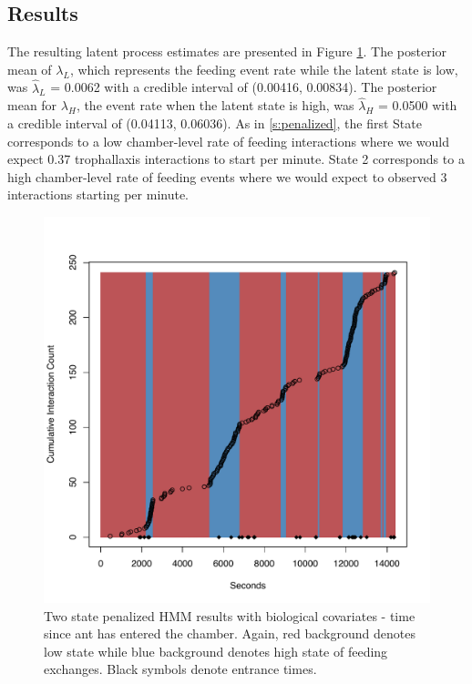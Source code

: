 \documentclass[cmbright,fleqn,referee]{envauth}
\begin{document}
\subsection{Results}
The resulting latent process estimates are presented in Figure \ref{f:covstates}. The posterior mean of $\lambda_L$, which represents the feeding event rate while the latent state is low, was $\hat{\lambda}_L$ = 0.0062 with a credible interval of (0.00416, 0.00834). The posterior mean for $\lambda_H$, the event rate when the latent state is high, was $\hat{\lambda}_H$ = 0.0500 with a credible interval of (0.04113, 0.06036). As in \ref{s:penalized}, the first State corresponds to a low chamber-level rate of feeding interactions where we would expect 0.37 trophallaxis interactions to start per minute. State 2 corresponds to a high chamber-level rate of feeding events where we would expect to observed 3 interactions starting per minute. 
% 
\begin{figure}
 \centerline{\includegraphics[width=6in]{MSPEcov-3_states.pdf}}
 \caption{Two state penalized HMM results with biological covariates - time since ant has entered the chamber. Again, red background denotes low state while blue background denotes high state of feeding exchanges. Black symbols denote entrance times.}
\label{f:covstates}
\end{figure}
% 
\end{document}
